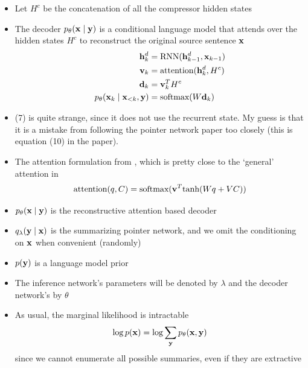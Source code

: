 \begin{frame}
\begin{center}
\end{center}
\begin{itemize}
\item Let $H^c$ be the concatenation of all the compressor hidden states
\item The decoder $p_\theta(\mathbf{x}\mid\mathbf{y})$
is a conditional language model that attends over the hidden states $H^c$ 
to reconstruct the original source sentence $\mathbf{x}$
\begin{align}
\mathbf{h}_k^d &= \textrm{RNN}(\mathbf{h}_{k-1}^d, \mathbf{x}_{k-1})\\
\mathbf{v}_k &= \textrm{attention}(\mathbf{h}_k^d, H^c)\\
\mathbf{d}_k &= \mathbf{v}_k^TH^c\\
p_\theta(\mathbf{x}_k\mid\mathbf{x}_{<k}, \mathbf{y}) &= \textrm{softmax}(W \mathbf{d}_k)
\end{align}
\item (7) is quite strange, since it does not use the recurrent state.
My guess is that it is a mistake from following the pointer network
paper too closely (this is equation (10) in the paper).
\end{itemize}
\end{frame}

\begin{frame}
\begin{center}
\end{center}
\begin{itemize}
\item The attention formulation from \cite{Vinyals2015a},
which is pretty close to the `general' attention in \cite{Luong2015}
\begin{equation}
\textrm{attention}(q, C) = \textrm{softmax}(\mathbf{v}^T\textrm{tanh}(Wq + VC))
\end{equation}
\item $p_\theta(\mathbf{x}\mid\mathbf{y})$ is the reconstructive attention based decoder
\item $q_\lambda(\mathbf{y}\mid\mathbf{x})$ is the summarizing pointer network,
and we omit the conditioning on $\mathbf{x}$ when convenient (randomly)
\item $p(\mathbf{y})$ is a language model prior
\end{itemize}
\end{frame}

\begin{frame}
\begin{center}
\end{center}
\begin{itemize}
\item The inference network's parameters will be denoted by $\lambda$
and the decoder network's by $\theta$
\item As usual, the marginal likelihood is intractable
\begin{equation}
\log p(\mathbf{x}) = \log \sum_{\mathbf{y}} p_\theta(\mathbf{x}, \mathbf{y})
\end{equation}
since we cannot enumerate all possible summaries, even if they are extractive
\end{itemize}
\end{frame}

